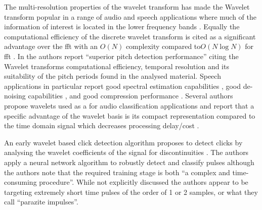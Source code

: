 The multi-resolution properties of the wavelet transform has made the Wavelet transform popular in a range of audio and speech applications where much of the information of interest is located in the lower frequency bands \cite{Sinha1993}\cite{Czyzewski1995}\cite{Lambrou1998}\cite{Biscainho2000}\linebreak[0]\cite{Tzanetakis2001}\linebreak[0]\cite{Zurera2001}\cite{Lin2005}\cite{Nongpiur2008}. Equally the computational efficiency of the discrete wavelet transform is cited \cite{Kadambe1992} as a significant advantage over the \DIFdelbegin {}\DIFdelend \DIFaddbegin \gls{fft} \DIFaddend with an $O(N)$ complexity compared to\linebreak[0] $O(N\log{N})$ for \DIFdelbegin {}\DIFdelend \DIFaddbegin {}\gls{fft} \DIFaddend \cite{Mallat1999}. In \cite{Kadambe1992} the authors report ``superior pitch detection performance'' citing the Wavelet transforms computational efficiency, temporal resolution and its suitability of the pitch periods found in the analysed material. Speech applications in particular report good spectral estimation capabilities \cite{Hu2004}, good de-noising capabilities \cite{Donoho1995}\cite{Seok1997}, and good compression performance \cite{Sinha1993}\cite{Fgee1999}. Several authors propose wavelets used as a \DIFdelbegin {}\DIFdelend \DIFaddbegin {}\DIFaddend for audio classification applications \cite{Lambrou1998}\cite{Tzanetakis2001}\cite{Lin2005} and report that a specific advantage of the wavelet basis is its compact representation compared to the time domain signal which decreases processing delay/cost \cite{Lambrou1998}.

An early wavelet based click detection algorithm proposes to detect clicks by analysing the wavelet coefficients of the signal for discontinuities \cite{Czyzewski1995}. The authors apply a neural network algorithm to robustly detect and classify pulses although the authors note that the required training stage is both ``a complex and time-consuming procedure''. While not explicitly discussed the authors appear to be targeting extremely short time pulses of the order of 1 or 2 samples, or what they call ``parazite impulses''.

